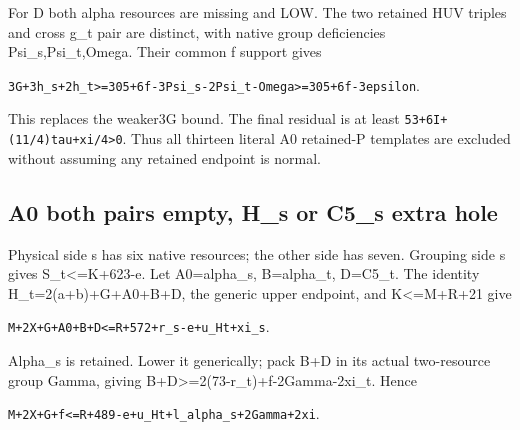 \documentclass[10pt,a4paper]{article}
\theoremstyle{definition}
\begin{document}
For D both alpha resources are missing and LOW. The two retained HUV
triples and cross g\_\allowbreak{}t pair are distinct,\allowbreak{} with native group deficiencies
Psi\_\allowbreak{}s,\allowbreak{}Psi\_\allowbreak{}t,\allowbreak{}Omega. Their common f support gives

\texttt{3G+\allowbreak{}3h\_\allowbreak{}\allowbreak{}s+\allowbreak{}2h\_\allowbreak{}\allowbreak{}t>=\allowbreak{}305+\allowbreak{}6f-3Psi\_\allowbreak{}\allowbreak{}s-2Psi\_\allowbreak{}\allowbreak{}t-Omega>=\allowbreak{}305+\allowbreak{}6f-3epsilon}.

This replaces the weaker3G bound. The final residual is at least
\texttt{53+\allowbreak{}6I+\allowbreak{}(11/\allowbreak{}4)tau+\allowbreak{}xi/\allowbreak{}4>0}. Thus all thirteen
literal A0 retained-P templates are excluded without assuming any
retained endpoint is normal.

\hypertarget{a0-both-pairs-empty-h_s-or-c5_s-extra-hole}{%
\subsection{A0 both pairs empty,\allowbreak{} H\_\allowbreak{}s or C5\_\allowbreak{}s extra
hole}\label{a0-both-pairs-empty-h_s-or-c5_s-extra-hole}}

Physical side s has six native resources; the other side has seven.
Grouping side s gives S\_\allowbreak{}t\textless=\allowbreak{}K+\allowbreak{}623-e. Let A0=\allowbreak{}alpha\_\allowbreak{}s,\allowbreak{}
B=\allowbreak{}alpha\_\allowbreak{}t,\allowbreak{} D=\allowbreak{}C5\_\allowbreak{}t. The identity H\_\allowbreak{}t=\allowbreak{}2(a+\allowbreak{}b)+\allowbreak{}G+\allowbreak{}A0+\allowbreak{}B+\allowbreak{}D,\allowbreak{} the generic
upper endpoint,\allowbreak{} and K\textless=\allowbreak{}M+\allowbreak{}R+\allowbreak{}21 give

\texttt{M+\allowbreak{}2X+\allowbreak{}G+\allowbreak{}A0+\allowbreak{}B+\allowbreak{}D<=\allowbreak{}R+\allowbreak{}572+\allowbreak{}r\_\allowbreak{}\allowbreak{}s-e+\allowbreak{}u\_\allowbreak{}\allowbreak{}Ht+\allowbreak{}xi\_\allowbreak{}\allowbreak{}s}.

Alpha\_\allowbreak{}s is retained. Lower it generically; pack B+\allowbreak{}D in its actual
two-resource group Gamma,\allowbreak{} giving
B+\allowbreak{}D\textgreater=\allowbreak{}2(73-r\_\allowbreak{}t)+\allowbreak{}f-2Gamma-2xi\_\allowbreak{}t. Hence

\texttt{M+\allowbreak{}2X+\allowbreak{}G+\allowbreak{}f<=\allowbreak{}R+\allowbreak{}489-e+\allowbreak{}u\_\allowbreak{}\allowbreak{}Ht+\allowbreak{}l\_\allowbreak{}\allowbreak{}alpha\_\allowbreak{}\allowbreak{}s+\allowbreak{}2Gamma+\allowbreak{}2xi}.
\end{document}
